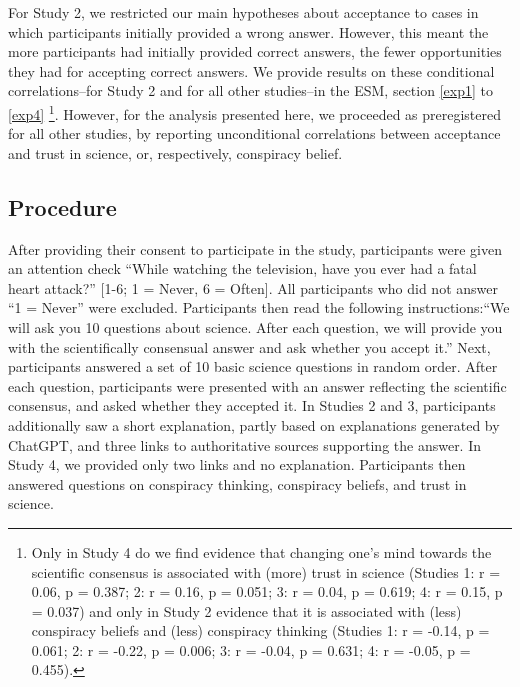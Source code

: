 \documentclass[
  doc,floatsintext]{apa6}
\begin{document}
For Study 2, we restricted our main hypotheses about acceptance to cases in which participants initially provided a wrong answer. However, this meant the more participants had initially provided correct answers, the fewer opportunities they had for accepting correct answers. We provide results on these conditional correlations--for Study 2 and for all other studies--in the ESM, section \ref{exp1} to \ref{exp4} \footnote{Only in Study 4 do we find evidence that changing one's mind towards the scientific consensus is associated with (more) trust in science (Studies 1: r = 0.06, p = 0.387; 2: r = 0.16, p = 0.051; 3: r = 0.04, p = 0.619; 4: r = 0.15, p = 0.037) and only in Study 2 evidence that it is associated with (less) conspiracy beliefs and (less) conspiracy thinking (Studies 1: r = -0.14, p = 0.061; 2: r = -0.22, p = 0.006; 3: r = -0.04, p = 0.631; 4: r = -0.05, p = 0.455).}. However, for the analysis presented here, we proceeded as preregistered for all other studies, by reporting unconditional correlations between acceptance and trust in science, or, respectively, conspiracy belief.

\subsection{Procedure}\label{procedure}

After providing their consent to participate in the study, participants were given an attention check ``While watching the television, have you ever had a fatal heart attack?'' {[}1-6; 1 = Never, 6 = Often{]}. All participants who did not answer ``1 = Never'' were excluded. Participants then read the following instructions:``We will ask you 10 questions about science. After each question, we will provide you with the scientifically consensual answer and ask whether you accept it.'' Next, participants answered a set of 10 basic science questions in random order. After each question, participants were presented with an answer reflecting the scientific consensus, and asked whether they accepted it. In Studies 2 and 3, participants additionally saw a short explanation, partly based on explanations generated by ChatGPT, and three links to authoritative sources supporting the answer. In Study 4, we provided only two links and no explanation. Participants then answered questions on conspiracy thinking, conspiracy beliefs, and trust in science.
\end{document}

